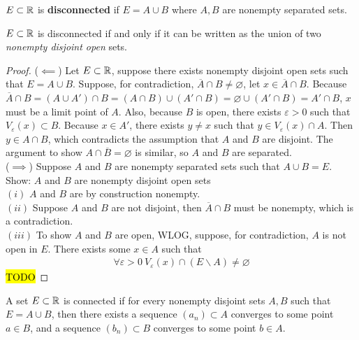 \documentclass[11pt]{article}
\begin{document}
	\begin{definition}
		$E \subset \mathbb{R}$ is \textbf{disconnected} if $E = A \cup B$ where $A, B$ are nonempty separated sets.
	\end{definition}
	
	\begin{proposition}
		$E \subset \mathbb{R}$ is disconnected if and only if it can be written as the union of two \emph{nonempty disjoint open} sets.
	\end{proposition}
	
	\begin{proof}
		($\impliedby$) Let $E \subset \mathbb{R}$, suppose there exists nonempty disjoint open sets such that $E = A \cup B$. Suppose, for contradiction, $\overline{A} \cap B \neq \varnothing$, let $x \in \overline{A} \cap B$. Because $\overline{A} \cap B = (A \cup A') \cap B = (A \cap B) \cup (A' \cap B) = \varnothing \cup (A' \cap B) = A' \cap B$, $x$ must be a limit point of $A$. Also, because $B$ is open, there exists $\varepsilon > 0$ such that $V_\varepsilon(x) \subset B$. Because $x \in A'$, there exists $y \neq x$ such that $y \in V_\varepsilon(x) \cap A$. Then $y \in A \cap B$, which contradicts the assumption that $A$ and $B$ are disjoint. The argument to show $A \cap \overline{B} = \varnothing$ is similar, so $A$ and $B$ are separated.\\
		($\implies$) Suppose $A$ and $B$ are nonempty separated sets such that $A \cup B = E$. Show: $A$ and $B$ are nonempty disjoint open sets \\
		$(i)$ $A$ and $B$ are by construction nonempty. \\
		$(ii)$ Suppose $A$ and $B$ are not disjoint, then $\overline{A} \cap  B$ must be nonempty, which is a contradiction. \\
		$(iii)$ To show $A$ and $B$ are open, WLOG, suppose, for contradiction, $A$ is not open in $E$. There exists some $x \in A $ such that
		\begin{align}
			\forall \varepsilon > 0\ V_\varepsilon(x) \cap (E\backslash A) \neq \varnothing
		\end{align}
		\hl{TODO}
	\end{proof}
	
	\begin{theorem}
		A set $E \subset \mathbb{R}$ is connected if for every nonempty disjoint sets $A, B$ such that $E = A \cup B$, then there exists a sequence $(a_n) \subset A$ converges to some point $a \in B$, and a sequence $(b_n) \subset B$ converges to some point $b \in A$.
	\end{theorem}
	
\end{document}
